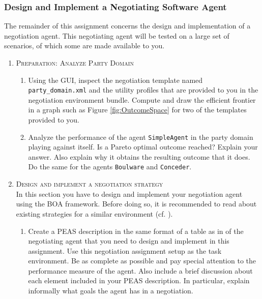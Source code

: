 \documentclass[a4paper]{article}
\newcommand{\preferenceprofilesonlinedate}{18 November}
\begin{document}
\subsubsection{Design and Implement a Negotiating Software Agent}

The remainder of this assignment concerns the design and implementation of a negotiation agent. This negotiating agent will be tested on a large set of scenarios, of which some are made available to you.

\begin{enumerate} 
\item \textsc{Preparation: Analyze Party Domain}

  \begin{enumerate}
  \item Using the GUI, inspect the negotiation template named \verb|party_domain.xml| and the utility profiles that are provided to you in the negotiation environment bundle. 
  Compute and draw the efficient frontier in a graph such as Figure \ref{fig:OutcomeSpace} for two of the templates provided to you.
    \item Analyze the performance of the agent \verb|SimpleAgent| in the party domain playing against itself. Is a Pareto optimal outcome reached? Explain your answer. Also explain why it obtains the resulting outcome that it does. Do the same for the agents \verb|Boulware| and \verb|Conceder|.
  \end{enumerate}
  \item \textsc{Design and implement a negotiation strategy}\\ \break
In this section you have to design and implement your negotiation agent using the BOA framework. Before doing so, it is recommended to read about existing strategies for a similar environment (cf. \cite{ANAC2011Baa,ANAC2011Ada,ANAC2011Dir,ANAC2011Fis,ANAC2011Frie,ANAC2011Kaw,ANAC2011Kri,ANAC2011Wil}).
  \begin{enumerate}
 	 \item Create a PEAS description in the same format of a table as in \cite{Rus033rd} of the negotiating agent that you need to design and implement in this assignment. Use this negotiation assignment setup as the task environment. Be as complete as possible and pay special attention to the performance measure of the agent. Also include a brief discussion about each element included in your PEAS description. In particular, explain informally what goals the agent has in a negotiation.


\end{enumerate}
\end{enumerate}
\end{document}
